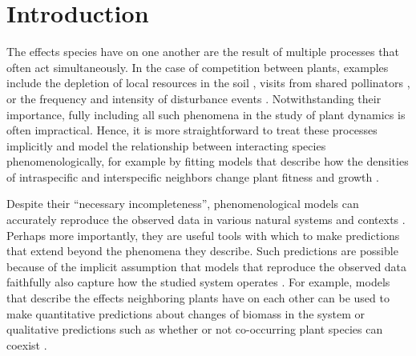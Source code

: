 \section*{Introduction}


The effects species have on one another are the result of multiple processes that often act simultaneously. In the case of competition between plants, examples include the depletion of local resources in the soil \citep{dybzinski2007resource, craine2013mechanisms},  visits from shared pollinators \citep{lanuza_opposing_2018}, or the frequency and intensity of disturbance events \citep{pickett1980non, villarreal2009species}. Notwithstanding their importance, fully including all such phenomena in the study of plant dynamics is often impractical. Hence, it is more straightforward to treat these processes implicitly and model the relationship between interacting species phenomenologically, for example by fitting models that describe how the densities of intraspecific and interspecific neighbors change plant fitness and growth \citep{case1999illustrated, adler2018competition}.


Despite their ``necessary incompleteness'', phenomenological models can accurately reproduce the observed data in various natural systems and contexts \citep{bolker_ecological_2008}. Perhaps more importantly, they are useful tools with which to make predictions that extend beyond the phenomena they describe. Such predictions are possible because of the implicit assumption that models that reproduce the observed data faithfully also capture how the studied system operates \citep{marquet2015importance}. For example, models that describe the effects neighboring plants have on each other can be used to make quantitative predictions about changes of biomass in the system \citep{godoy2020excess, lai2020role} or qualitative predictions such as whether or not co-occurring plant species can coexist \citep{levine2009importance, zepeda2019fluctuation}.


